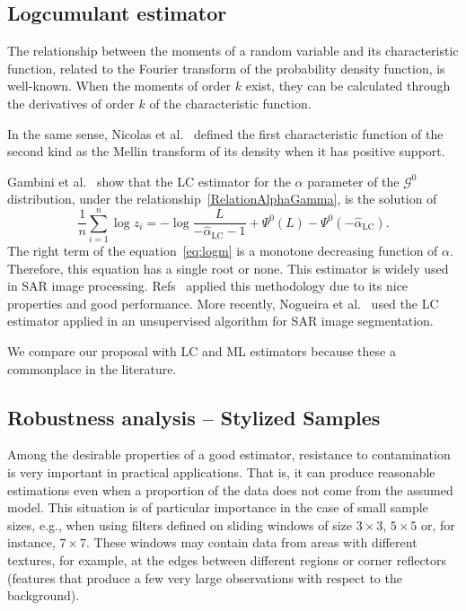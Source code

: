 \documentclass[twocolumn]{svjour3}
\begin{document}
	\subsection{Logcumulant estimator}\label{lc}
	
	The relationship between the moments of a random variable and its characteristic function, related to the Fourier transform of the probability density function, is well-known. 
	When the moments of order $k$ exist, they can be calculated through the derivatives of order $k$ of the characteristic function.
	
	In the same sense, Nicolas et al.~\cite{nicolas2002} defined the first characteristic function of the second kind as the Mellin transform of its density when it has positive support. 
	
	Gambini et al.~\cite{gambini2015} show that the LC estimator for the $\alpha$ parameter of the $\mathcal{G}^0$ distribution, under the relationship~\eqref{RelationAlphaGamma}, is the solution of 
	\begin{equation} \label{eq:logm}
	\frac{1}{n} \sum_{i=1}^n\log z_i =   -\log \frac{L}{-\widehat\alpha_{\text{{LC}}}-1} + \Psi^0(L) - \Psi^0(-\widehat\alpha_{\text{{LC}}}).
	\end{equation}
	The right term of the equation~\eqref{eq:logm} is a monotone decreasing function of $\alpha$. Therefore, this equation has a single root or none. 
	This estimator is widely used in SAR image processing. 
	Refs~\cite{MellinAnalysisPolSAR,BujorTrouveValetNicolas2004,khan2014} applied this methodology due to its nice properties and good performance. 
	More recently, Nogueira et al.~\cite{Nogueira2019} used the LC estimator applied in an unsupervised algorithm for SAR image segmentation.
	
	We compare our proposal with LC and ML estimators because these a commonplace in the literature.
	
	\subsection{Robustness analysis -- Stylized Samples}
	\label{robustez}
	Among the desirable properties of a good estimator, resistance to contamination is very important in practical applications. 
	That is, it can produce reasonable estimations even when a proportion of the data does not come from the assumed model. 
	This situation is of particular importance in the case of small sample sizes, e.g., when using filters defined on sliding windows of size $3 \times 3$, $5 \times 5$ or, for instance, $7 \times 7$. 
	These windows may contain data from areas with different textures, for example, at the edges between different regions or corner reflectors (features that produce a few very large observations with respect to the background).
	
\end{document}
